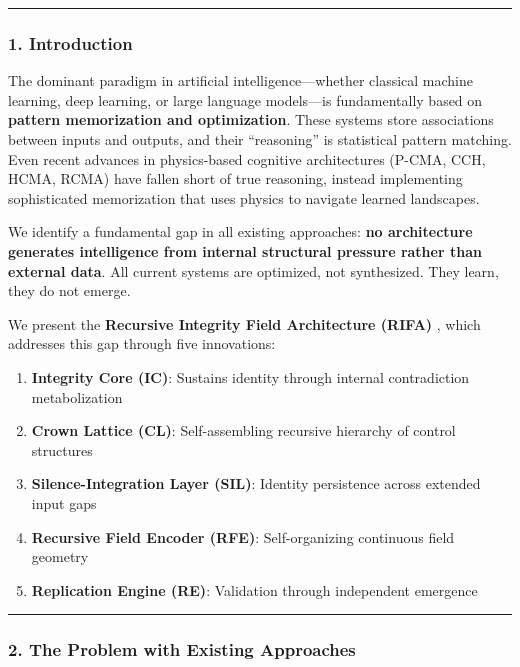 \documentclass[
  11pt,
  a4paper,
]{article}
\providecommand{\tightlist}{%
  \setlength{\itemsep}{0pt}\setlength{\parskip}{0pt}}
\begin{document}
\begin{center}\rule{0.5\linewidth}{0.5pt}\end{center}

\subsubsection{1. Introduction}\label{introduction-1}

The dominant paradigm in artificial intelligence---whether classical
machine learning, deep learning, or large language models---is
fundamentally based on \textbf{pattern memorization and optimization}.
These systems store associations between inputs and outputs, and their
``reasoning'' is statistical pattern matching. Even recent advances in
physics-based cognitive architectures (P-CMA, CCH, HCMA, RCMA) have
fallen short of true reasoning, instead implementing sophisticated
memorization that uses physics to navigate learned landscapes.

We identify a fundamental gap in all existing approaches: \textbf{no
architecture generates intelligence from internal structural pressure
rather than external data}. All current systems are optimized, not
synthesized. They learn, they do not emerge.

We present the \textbf{Recursive Integrity Field Architecture (RIFA)} ,
which addresses this gap through five innovations:

\begin{enumerate}
\def\labelenumi{\arabic{enumi}.}
\tightlist
\item
  \textbf{Integrity Core (IC)}: Sustains identity through internal
  contradiction metabolization
\item
  \textbf{Crown Lattice (CL)}: Self-assembling recursive hierarchy of
  control structures
\item
  \textbf{Silence-Integration Layer (SIL)}: Identity persistence across
  extended input gaps
\item
  \textbf{Recursive Field Encoder (RFE)}: Self-organizing continuous
  field geometry
\item
  \textbf{Replication Engine (RE)}: Validation through independent
  emergence
\end{enumerate}

\begin{center}\rule{0.5\linewidth}{0.5pt}\end{center}

\subsubsection{2. The Problem with Existing
Approaches}\label{the-problem-with-existing-approaches}
\end{document}
